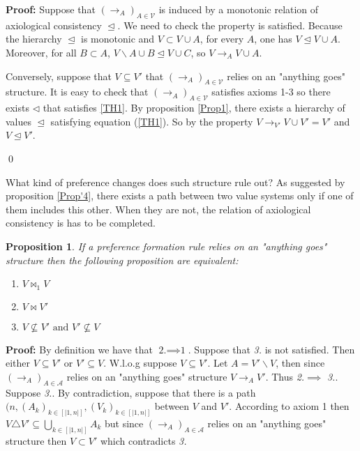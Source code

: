 \documentclass[11pt]{article}
\newtheorem{proposition}{Proposition}
\begin{document}
\noindent
\textbf{Proof:} Suppose that $(\rightarrow_{A})_{A\in\mathcal{V}}$ is induced by a monotonic relation of axiological consistency $\trianglelefteq$.  We need to check the property is satisfied. Because the hierarchy $\trianglelefteq$ is monotonic and $V\subset V\cup A$, for every $A$, one has $V\trianglelefteq V\cup A$. Moreover, for all $B\subset A$, $V\backslash A\cup B\trianglelefteq V\cup C$, so  $V\rightarrow_{A}V\cup A$. 

Conversely, suppose that $V\subseteq V'$ that $(\rightarrow_{A})_{A\in\mathcal{V}}$ relies on an "anything goes" structure. It is easy to check that $(\rightarrow_{A})_{A\in\mathcal{V}}$ satisfies axioms 1-3 so there exists $\triangleleft$ that satisfies \ref{TH1}. By proposition \ref{Prop1}, there exists a hierarchy of values $\trianglelefteq$ satisfying equation (\ref{TH1}). So by the property  $V\rightarrow_{V'}V\cup V'= V'$ and $V\trianglelefteq V'$.

\qed
\vspace{0,5cm}


What kind of preference changes does such structure rule out? As suggested by proposition \ref{Prop'4}, there exists a path between two value systems only if one of them includes this other. When they are not, the relation of axiological consistency is has to be completed.  

\begin{proposition}
If a preference formation rule relies on an "anything goes" structure then the following proposition are equivalent:
\begin{enumerate}
\item $V \bowtie_1 V$
\item $V\bowtie V'$
\item $V\not\subseteq V'\mbox{ and }V'\not\subseteq V$
\label{Prop5}
\end{enumerate}
\end{proposition}

\noindent 
\textbf{Proof:} By definition we have that $\textit{2.}\implies \textit{1}$. Suppose that \textit{3.} is not satisfied. Then either $V\subseteq V'\mbox{ or }V'\subseteq V$. W.l.o.g suppose $V\subseteq V'$. Let $A= V'\backslash V$, then since $(\rightarrow_{A})_{A\in\mathcal{A}}$ relies on an "anything goes" structure $V\rightarrow_{A} V'$. Thus \textit{2.}$\implies$ \textit{3.}. Suppose \textit{3.}. By contradiction, suppose that there is a path $(n,(A_k)_{k\in [|1,n|]} ,(V_k)_{k\in [|1,n|]}$ between $V$ and $V'$. According to axiom 1 then $V\triangle V'\subseteq \displaystyle \bigcup_{k\in [|1,n|]} A_k$ but since $(\rightarrow_{A})_{A\in\mathcal{A}}$ relies on an "anything goes" structure then $V\subset V'$ which contradicts \textit{3.}
\end{document}

